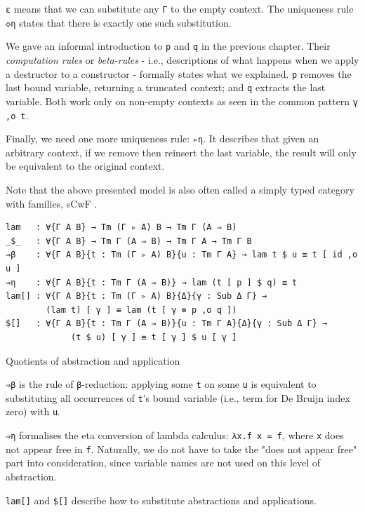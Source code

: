 \verb$ε$ means that we can substitute any \verb$Γ$ to the empty context. The uniqueness rule \verb$◇η$ states that there is exactly one such substitution.

We gave an informal introduction to \verb$p$ and \verb$q$ in the previous chapter. Their \textit{computation rules} or \textit{beta-rules} - i.e., descriptions of what happens when we apply a destructor to a constructor - formally states what we explained. \verb$p$ removes the last bound variable, returning a truncated context; and \verb$q$ extracts the last variable. Both work only on non-empty contexts as seen in the common pattern \verb$γ ,o t$.

Finally, we need one more uniqueness rule: \verb$▹η$. It describes that given an arbitrary context, if we remove then reinsert the last variable, the result will only be equivalent to the original context.

Note that the above presented model is also often called a simply typed category with families, sCwF \cite{castellan2021categories}.

\begin{listing}[H]
\begin{verbatim}
lam   : ∀{Γ A B} → Tm (Γ ▹ A) B → Tm Γ (A ⇒ B)
_$_   : ∀{Γ A B} → Tm Γ (A ⇒ B) → Tm Γ A → Tm Γ B
⇒β    : ∀{Γ A B}{t : Tm (Γ ▹ A) B}{u : Tm Γ A} → lam t $ u ≡ t [ id ,o u ]
⇒η    : ∀{Γ A B}{t : Tm Γ (A ⇒ B)} → lam (t [ p ] $ q) ≡ t
lam[] : ∀{Γ A B}{t : Tm (Γ ▹ A) B}{Δ}{γ : Sub Δ Γ} →
        (lam t) [ γ ] ≡ lam (t [ γ ⊚ p ,o q ])
$[]   : ∀{Γ A B}{t : Tm Γ (A ⇒ B)}{u : Tm Γ A}{Δ}{γ : Sub Δ Γ} →
             (t $ u) [ γ ] ≡ t [ γ ] $ u [ γ ]
\end{verbatim}
\caption{Quotients of abstraction and application}
\label{code:ot-functions}
\end{listing}

\verb$⇒β$ is the rule of \verb$β$-reduction: applying some \verb$t$ on some \verb$u$ is equivalent to substituting all occurrences of \verb$t$'s bound variable (i.e., term for De Bruijn index zero) with \verb$u$.

\verb$⇒η$ formalises the eta conversion of lambda calculus: \verb$λx.f x = f$, where \verb$x$ does not appear free in \verb$f$. Naturally, we do not have to take the "does not appear free" part into consideration, since variable names are not used on this level of abstraction.

\verb$lam[]$ and \verb$$\verb=$=\verb$[]$\verb$$ describe how to substitute abstractions and applications.

